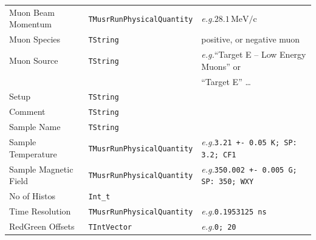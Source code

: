 \documentclass[twoside]{article}
\newcommand{\eg}{\emph{e.g.}\xspace}
\newcommand{\tstring}{\texttt{TString}\xspace}
\newcommand{\tintvec}{\texttt{TIntVector}\xspace}
\newcommand{\tquant}{\texttt{TMusrRunPhysicalQuantity}\xspace}
\begin{document}
\begin{small}
\begin{tabular}{l|l|l}
Muon Beam Momentum & \tquant    & \eg $28.1\,\mathrm{MeV/c}$ \\
Muon Species   & \tstring      & positive, or negative muon \\
Muon Source    & \tstring      & \eg ``Target E -- Low Energy Muons'' or \\
               &               & ``Target E'' \ldots \\
Setup          & \tstring      & \\
Comment        & \tstring      & \\
Sample Name    & \tstring      & \\
Sample Temperature & \tquant    & \eg \verb!3.21 +- 0.05 K; SP: 3.2; CF1! \\
Sample Magnetic Field & \tquant & \eg \verb!350.002 +- 0.005 G; SP: 350; WXY! \\
No of Histos   & \verb!Int_t!  & \\
Time Resolution & \tquant       & \eg \verb!0.1953125 ns! \\
RedGreen Offsets & \tintvec & \eg \verb!0; 20! \\
\end{tabular}
\end{small}
\end{document}
